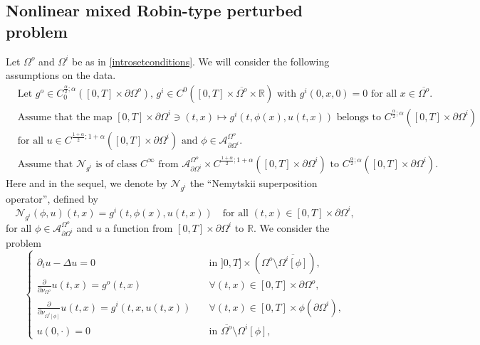 \documentclass[11pt,reqno,a4paper]{amsart}
\theoremstyle{plain}
\theoremstyle{definition}
\newcommand{\R}{\mathbb{R}}
\begin{document}
\subsection{Nonlinear mixed Robin-type perturbed problem}
Let $\Omega^o$ and $\Omega^i$ be as in \eqref{introsetconditions}.  We will consider the following assumptions on the data. 
\begin{equation}\label{introfunconditions 2} 
\begin{split}
    &\text{Let } g^o \in C_{0}^{\frac{\alpha}{2}; \alpha}([0,T] \times \partial\Omega^o), \, g^i  \in C^0([0,T]\times \overline{\Omega^o} \times\R) \text{ with } g^i(0,x,0)=0 \text{ for all } x\in \overline{\Omega^o}.
    \\
    &\text{Assume that the map } [0,T] \times \partial\Omega^i \ni (t,x) \mapsto g^i(t,\phi(x), u(t,x)) \text{ belongs to } C^{\frac{\alpha}{2}; \alpha}([0,T] \times \partial\Omega^i) 
    \\
    &\text{for all } u \in  C^{\frac{1+\alpha}{2}; 1+\alpha}([0,T] \times \partial\Omega^i) \text{ and } \phi \in \mathcal{A}^{\Omega^o}_{\partial\Omega^i}.
    \\
    &\text{Assume that } \mathcal{N}_{g^i} \text{ is of class } C^\infty \text{ from } \mathcal{A}^{\Omega^o}_{\partial\Omega^i} \times C^{\frac{1+\alpha}{2}; 1+\alpha}([0,T] \times \partial\Omega^i) \text{ to } C^{\frac{\alpha}{2}; \alpha}([0,T] \times \partial\Omega^i).
\end{split} 
\end{equation}
Here and in the sequel, we denote by $\mathcal{N}_{g^i}$ the ``Nemytskii superposition operator'', defined by
\begin{equation*}
    \mathcal{N}_{g^i}(\phi, u) (t,x) = g^i(t,\phi(x), u(t,x)) \quad \text{for all } (t,x) \in [0,T] \times \partial\Omega^i,
\end{equation*}
for all $\phi \in \mathcal{A}^{\Omega^o}_{\partial\Omega^i}$ and $u$ a function from $[0,T] \times \partial\Omega^i$ to $\R$.
We consider the problem                
\begin{equation}\label{princeqpertu 2}
\begin{cases}
    \partial_t u - \Delta u = 0 & \quad\text{in } ]0,T] \times (\Omega^o \setminus \overline{\Omega^i[\phi]}), 
    \\
    \frac{\partial}{\partial\nu_{\Omega^o}} u(t,x) = g^o(t,x)& \quad \forall (t,x)\in [0,T] \times \partial \Omega^o, 
    \\
    \frac{\partial}{\partial\nu_{\Omega^i[\phi]}} u (t,x) = g^i(t,x,u(t,x)) & \quad \forall (t,x)\in  [0,T] \times \phi(\partial\Omega^i),
    \\
    u(0,\cdot)=0 & \quad \text{in } \overline{\Omega^o} \setminus \Omega^i[\phi],
\end{cases}
\end{equation}
\end{document}
